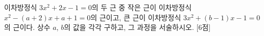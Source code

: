 이차방정식 $3x^2+2x-1=0$의 두 근 중 작은 근이 이차방정식 $x^2-(a+2)x+a+1=0$의 근이고, 큰 근이 이차방정식 $3x^2+(b-1)x-1=0$의 근이다. 상수 $a$, $b$의 값을 각각 구하고, 그 과정을 서술하시오. \mbox{[6점]}

